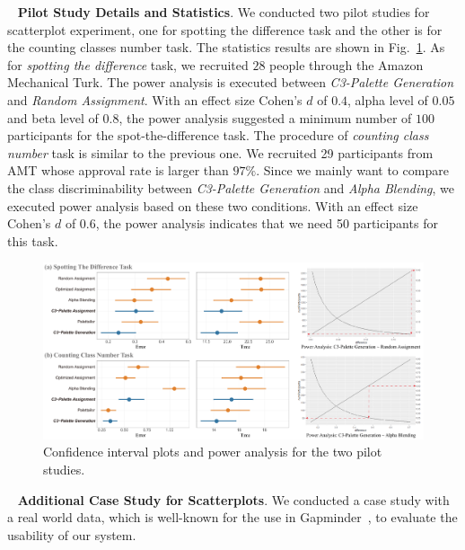 \documentclass[review,onecolumn]{vgtc}                %
\newcommand{\myparagraph}[1]{\mbox{\ } \newline \noindent \textbf{#1}}
\renewcommand{\paragraph}[1]{\myparagraph{#1}}
\begin{document}
\paragraph{Pilot Study Details and Statistics}.
We conducted two pilot studies for scatterplot experiment, one for spotting the difference task and the other is for the counting classes number task. The statistics results are shown in Fig.~\ref{fig:pilotResults}.
As for \emph{spotting the difference} task, we recruited $28$ people through the Amazon Mechanical Turk. The power analysis is executed between \emph{C3-Palette Generation} and \emph{Random Assignment}. With an effect size Cohen's $d$ of $0.4$, alpha level of $0.05$ and beta level of $0.8$, the power analysis suggested a minimum number of $100$ participants for the spot-the-difference task.
The procedure of \emph{counting class number} task is similar to the previous one. We recruited 29 participants from AMT whose approval rate is larger than $97\%$. Since we mainly want to compare the class discriminability between \emph{C3-Palette Generation} and \emph{Alpha Blending}, we executed power analysis based on these two conditions.  With an effect size Cohen's $d$ of $0.6$, the power analysis indicates that we need 50 participants for this task.

\begin{figure}[h]
\centering
\includegraphics[width=1\linewidth]{user-result-pilot.pdf}
\caption{Confidence interval plots and power analysis for the two pilot studies.
}
\vspace*{-5mm}
\label{fig:pilotResults}
\end{figure}



\paragraph{Additional Case Study for Scatterplots}.
We conducted a case study with a real world data, which is well-known for the use in Gapminder~\cite{gapminder}, to evaluate the usability of our system.
\end{document}
